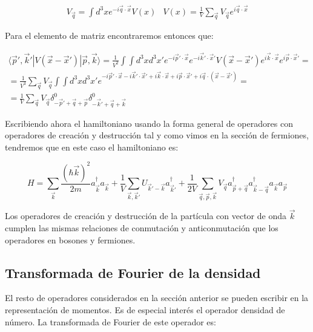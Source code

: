 \documentclass{article} %
\begin{document}
$$
\begin{array}{cc}
V_{\vec{q}} = \int d^3 x e^{-i\vec{q} \cdot \vec{x}} V(x) & V(x) = \frac{1}{V} \sum_{\vec{q}} V_{\vec{q}} e^{i \vec{q} \cdot \vec{x}}
\end{array}
$$

Para el elemento de matriz encontraremos entonces que:

\begin{align*}
\langle \vec{p}', \vec{k}' | V(\vec{x} - \vec{x}') | \vec{p}, \vec{k} \rangle = \frac{1}{V^2} \int \int d^3 x d^3 x' e^{-i\vec{p}' \cdot \vec{x}} e^{-i\vec{k}' \cdot \vec{x}'} V(\vec{x} - \vec{x}') e^{i\vec{k} \cdot \vec{x}} e^{i\vec{p} \cdot \vec{x}'} = \\ = \frac{1}{V^3} \sum_{\vec{q}} V_{\vec{q}} \int \int d^3 x d^3 x' e^{-i\vec{p}' \cdot \vec{x} -i\vec{k}' \cdot \vec{x}' + i\vec{k} \cdot \vec{x} + i\vec{p} \cdot \vec{x}' + i \vec{q} \cdot (\vec{x} - \vec{x}')} = \\ = \frac{1}{V} \sum_{\vec{q}} V_{\vec{q}} \delta^0_{-\vec{p}' + \vec{q} + \vec{p}} \delta^0_{-\vec{k}' + \vec{q} + \vec{k}}
\end{align*}

Escribiendo ahora el hamiltoniano usando la forma general de operadores con operadores de creación y destrucción tal y como vimos en la sección de fermiones, tendremos que en este caso el hamiltoniano es:

\begin{equation}
H = \sum_{\vec{k}} \frac{(\hbar \vec{k})^2}{2m} a_{\vec{k}}^{\dagger} a_{\vec{k}} + \frac{1}{V} \sum_{\vec{k}, \vec{k}'} U_{\vec{k}' - \vec{k}} a_{\vec{k}'}^{\dagger} + \frac{1}{2V} \sum_{\vec{q}, \vec{p}, \vec{k}} V_{\vec{q}} a^{\dagger}_{\vec{p} + \vec{q}} a^{\dagger}_{\vec{k} - \vec{q}} a_{\vec{k}} a_{\vec{p}}
\end{equation}

Los operadores de creación y destrucción de la partícula con vector de onda $\vec{k}$ cumplen las mismas relaciones de conmutación y anticonmutación que los operadores en bosones y fermiones.

\subsection{Transformada de Fourier de la densidad}

El resto de operadores considerados en la sección anterior se pueden escribir en la representación de momentos. Es de especial interés el operador densidad de número. La transformada de Fourier de este operador es:
\end{document}

